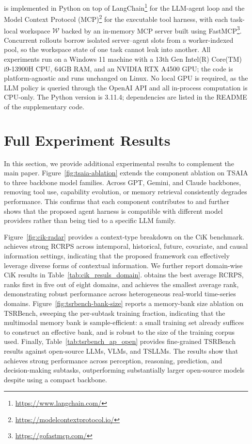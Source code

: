 \method is implemented in Python on top of
LangChain\footnote{\url{https://www.langchain.com/}} for the LLM-agent loop and the Model Context Protocol (MCP)\footnote{\url{https://modelcontextprotocol.io/}} for the executable tool harness, with each task-local workspace $\mathcal{W}$ backed by an in-memory MCP server built using FastMCP\footnote{\url{https://gofastmcp.com/}}. Concurrent rollouts borrow isolated server--agent slots from a worker-indexed pool, so the workspace state of one task cannot leak into another.
All experiments run on a Windows 11 machine with a 13th Gen Intel(R) Core(TM) i9-13900H CPU, 64GB RAM, and an NVIDIA RTX A4500 GPU; the code is platform-agnostic and runs unchanged on Linux. No local GPU is required, as the LLM policy is queried through the OpenAI API and all in-process computation is CPU-only. The Python version is 3.11.4; dependencies are listed in the README of the supplementary code.

\section{Full Experiment Results}
\label{ap:full_experiments}


In this section, we provide additional experimental results to complement the main paper. 
Figure~\ref{fig:tsaia-ablation} extends the component ablation on TSAIA to three backbone model families. 
Across GPT, Gemini, and Claude backbones, removing tool use, capability evolution, or memory retrieval consistently degrades performance. 
This confirms that each component contributes to \method and further shows that the proposed agent harness is compatible with different model providers rather than being tied to a specific LLM family.

Figure~\ref{fig:cik-radar} provides a context-type breakdown on the CiK benchmark. 
\method achieves strong RCRPS across intemporal, historical, future, covariate, and causal information settings, indicating that the proposed framework can effectively leverage diverse forms of contextual information. 
We further report domain-wise CiK results in Table~\ref{tab:cik_resuls_domain}. 
\method obtains the best average RCRPS, ranks first in five out of eight domains, and achieves the smallest average rank, demonstrating robust performance across heterogeneous real-world time-series domains.
Figure~\ref{fig:tsrbench-bank-size} reports a memory-bank size ablation on TSRBench, sweeping the per-subtask training fraction, indicating that the multimodal memory bank is sample-efficient: a small training set already suffices to construct an effective bank, and \method is robust to the size of the training corpus used.
Finally, Table~\ref{tab:tsrbench_ap_open} provides fine-grained TSRBench results against open-source LLMs, VLMs, and TSLLMs. 
The results show that \method achieves strong performance across perception, reasoning, prediction, and decision-making subtasks, outperforming substantially larger open-source models despite using a compact backbone.


